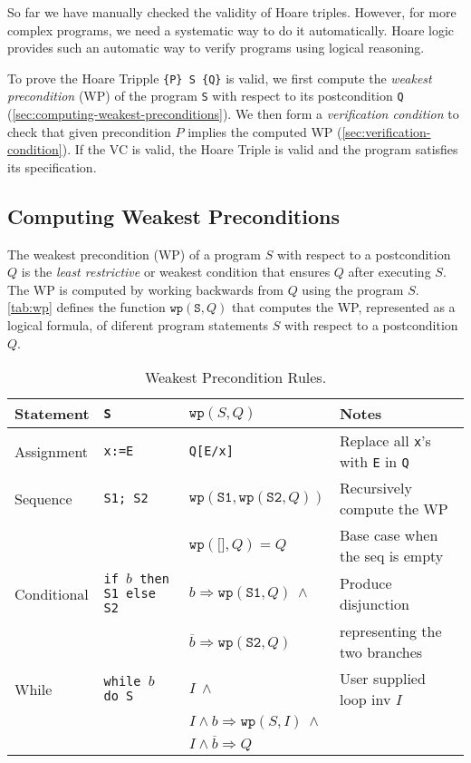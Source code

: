 \documentclass[oneside,11pt,dvipsnames]{book}
\renewcommand{\implies}{\Rightarrow}
\newcommand{\code}[1]{\texttt{#1}}
\begin{document}
So far we have manually checked the validity of Hoare triples. However, for more complex programs, we need a systematic way to do it automatically. Hoare logic provides such an automatic way to verify programs using logical reasoning.

To prove the Hoare Tripple \code{\{P\}\ \code{S} \{Q\}} is
valid, we first compute the \emph{weakest precondition} (WP) of the program \code{S} with respect to its postcondition \code{Q} (\autoref{sec:computing-weakest-preconditions}). We then form a \emph{verification condition} to check that given precondition $P$ implies the computed WP (\autoref{sec:verification-condition}). If the VC is valid, the Hoare Triple is valid and the program satisfies its specification.

\subsection{Computing Weakest Preconditions}\label{sec:computing-weakest-preconditions}

The weakest precondition (WP) of a program $S$ with respect to a postcondition $Q$ is the \emph{least restrictive} or weakest condition that ensures $Q$ after executing $S$. The WP is computed by working backwards from $Q$ using the program $S$. \autoref{tab:wp} defines the function $\code{wp}(\code{S}, Q)$ that computes the WP, represented as a logical formula, of diferent program statements $S$ with respect to a postcondition $Q$.

\begin{table}
    \caption{Weakest Precondition Rules.}\label{tab:wp}
    \centering
    \footnotesize
\begin{tabular}{l|l|l|l}
\textbf{Statement} & \code{S} & $\code{wp}(S,Q)$ & Notes\\
\midrule
Assignment & \code{x:=E} & \code{Q[E/x]} & Replace all \code{x}'s with \code{E} in \code{Q} \\
\midrule
Sequence & \code{S1; S2} & $\code{wp}(\code{S1}, \code{wp}(\code{S2}, Q))$ & Recursively compute the WP\\
&& $\code{wp}(\code{[]}, Q) = Q$ & Base case when the seq is empty\\
\midrule
Conditional & \code{if $b$ then S1 else S2} & $b \implies \code{wp}(\code{S1},Q)~\land$ & Produce disjunction\\
  & & $\overline{b} \implies \code{wp}(\code{S2},Q)$ & representing the two branches\\
\midrule
While & \code{while $b$ do S} & $I ~\land $ & User supplied loop inv $I$\\
&& $I \land b \implies \code{wp}(S, I) ~\land$ &\\ 
&& $I \land \overline{b} \implies Q$ &\\ 
\bottomrule
\end{tabular}
\end{table}
\end{document}
